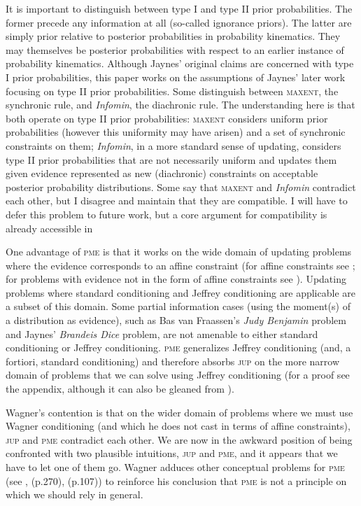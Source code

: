 \documentclass[entropy,article,accept,oneauthor,pdftex,12pt,a4paper]{mdpi}
\begin{document}
It is important to distinguish between type I and type II prior
probabilities. The former precede any information at all (so-called
ignorance priors). The latter are simply prior relative to posterior
probabilities in probability kinematics. They may themselves be
posterior probabilities with respect to an earlier instance of
probability kinematics. Although Jaynes' original claims are concerned
with type I prior probabilities, this paper works on the assumptions
of Jaynes' later work focusing on type II prior probabilities. Some
distinguish between \textsc{maxent}, the synchronic rule, and
\emph{Infomin}, the diachronic rule. The understanding here is that
both operate on type II prior probabilities: \textsc{maxent} considers
uniform prior probabilities (however this uniformity may have arisen)
and a set of synchronic constraints on them; \emph{Infomin}, in a more
standard sense of updating, considers type II prior probabilities that
are not necessarily uniform and updates them given evidence
represented as new (diachronic) constraints on acceptable posterior
probability distributions. Some say that \textsc{maxent} and
\emph{Infomin} contradict each other, but I disagree and maintain that
they are compatible. I will have to defer this problem to future work,
but a core argument for compatibility is already accessible in \cite{ref-32}

One advantage of \textsc{pme} is that it works on the wide domain of
updating problems where the evidence corresponds to an affine
constraint (for affine constraints see \cite{ref-3}; for problems with
evidence not in the form of affine constraints see \cite{ref-23}).
Updating problems where standard conditioning and Jeffrey conditioning
are applicable are a subset of this domain. Some partial information
cases (using the moment(s) of a distribution as evidence), such as Bas
van Fraassen's \emph{Judy Benjamin} problem and Jaynes' \emph{Brandeis
  Dice} problem, are not amenable to either standard conditioning or
Jeffrey conditioning. \textsc{pme} generalizes Jeffrey conditioning
(and, a fortiori, standard conditioning) and therefore absorbs
\textsc{jup} on the more narrow domain of problems that we can solve
using Jeffrey conditioning (for a proof see the appendix, although it
can also be gleaned from \cite{ref-1}).

Wagner's contention is that on the wider domain of problems where we
must use Wagner conditioning (and which he does not cast in terms of
affine constraints), \textsc{jup} and \textsc{pme} contradict each
other. We are now in the awkward position of being confronted with two
plausible intuitions, \textsc{jup} and \textsc{pme}, and it appears
that we have to let one of them go. Wagner adduces other conceptual
problems for \textsc{pme} (see \cite{ref-6, ref-26, ref-24, ref-29},
\cite{ref-33}(p.270), \cite{ref-8}(p.107)) to reinforce his conclusion
that \textsc{pme} is not a principle on which we should rely in
general.
\end{document}
